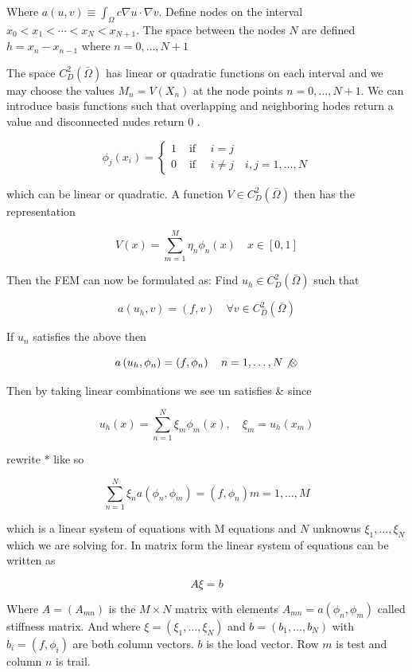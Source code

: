 \documentclass[12pt, oneside]{book}
\begin{document}
Where $a(u, v) \equiv \int_{\Omega} c \nabla u \cdot \nabla v$. Define nodes on the interval $x_{0}<x_{1}<\cdots<x_{N}<x_{N+1}$. The space between the nodes $N$ are defined $h=x_{n}-x_{n-1}$ where $n=0, \ldots, N+1$

The space $C_{D}^{2}(\bar{\Omega})$ has linear or quadratic functions on each interval and we may choose the values $M_{n}=V\left(X_{n}\right)$ at the node points $n=0, \ldots, N+1$. We can introduce basis functions such that overlapping and neighboring hodes return a value and disconnected nudes return 0 .

$$
\phi_{j}\left(x_{i}\right)= \begin{cases}1 & \text { if } \quad i=j \\ 0 & \text { if } \quad i \neq j \quad i, j=1, \ldots, N\end{cases}
$$

which can be linear or quadratic. A function $V \in C_{D}^{2}(\bar{\Omega})$ then has the representation

$$
V(x)=\sum_{m=1}^{M} \eta_{n} \phi_{n}(x) \quad x \in[0,1]
$$

Then the FEM can now be formulated as: Find $u_{h} \in C_{D}^{2}(\bar{\Omega})$ such that

$$
a\left(u_{h}, v\right)=(f, v) \quad \forall v \in C_{D}^{2}(\bar{\Omega})
$$

If $u_{n}$ satisfies the above then

$$
a\left(u_{h}, \phi_{n}\right)=\left(f, \phi_{n}\right) \quad n=1, \ldots, N \not \otimes
$$

Then by taking linear combinations we see un satisfies \& since

$$
u_{h}(x)=\sum_{n=1}^{N} \xi_{m} \phi_{m}(x), \quad \xi_{m}=u_{h}\left(x_{m}\right)
$$

rewrite * like so

$$
\sum_{n=1}^{N} \xi_{n} a\left(\phi_{n}, \phi_{m}\right)=\left(f, \phi_{n}\right) m=1, \ldots, M
$$

which is a linear system of equations with M equations and $N$ unknowus $\xi_{1}, \ldots, \xi_{N}$ which we are solving for. In matrix form the linear system of equations can be written as

$$
A \xi=b
$$

Where $A=\left(A_{m n}\right)$ is the $M \times N$ matrix with elements $A_{m n}=a\left(\phi_{n}, \phi_{m}\right)$ called stiffness matrix. And where $\xi=\left(\xi_{1}, \ldots, \xi_{N}\right)$ and $b=\left(b_{1}, \ldots, b_{N}\right)$ with $b_{i}=\left(f, \phi_{i}\right)$ are both column vectors. $b$ is the load vector. Row $m$ is test and column $n$ is trail.
\end{document}
